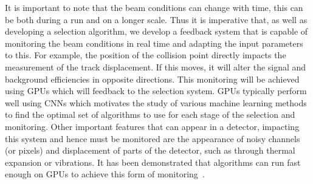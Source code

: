 It is important to note that the beam conditions can change with time, this can be both during a run and on a longer scale. Thus it is imperative that, as well as developing a selection algorithm, we develop a feedback system that is capable of monitoring the beam conditions in real time and adapting the input parameters to this. For example, the position of the collision point directly impacts the measurement of the track displacement. If this moves, it will alter the signal and background efficiencies in opposite directions. This monitoring will be achieved using GPUs which will feedback to the selection system. GPUs typically perform well using CNNs which motivates the study of various machine learning methods to find the optimal set of algorithms to use for each stage of the selection and monitoring. Other important features that can appear in a detector, impacting this system and hence must be monitored are the appearance of noisy channels (or pixels) and displacement of parts of the detector, such as through thermal expansion or vibrations. It has been demonstrated that algorithms can run fast enough on GPUs to achieve this form of monitoring~\cite{gpu2021}.




%        

